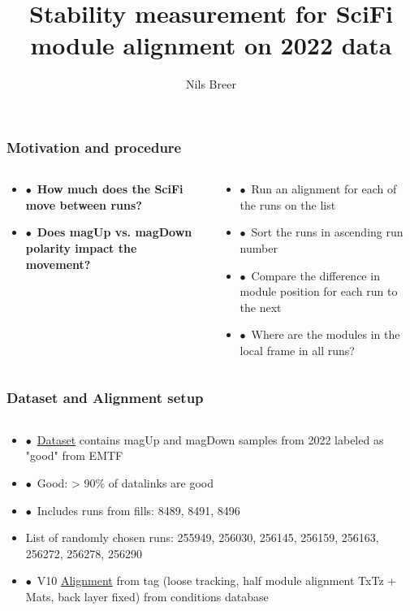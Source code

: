 \documentclass[aspectratio=1610, 12pt]{beamer}
\title{Stability measurement for SciFi module alignment on 2022 data}
\author[N.Breer]{Nils Breer}
\institute{TU Dortmund, AG Albrecht}
\begin{document}
\maketitle

\begin{frame}\frametitle{Motivation and procedure}
  \begin{columns}
    \begin{column}[c]{0.4\textwidth}
      \begin{itemize}
        \setlength\itemsep{1em}
        \item $\bullet$\, \textbf{How much does the SciFi move between runs?}
        \item $\bullet$\, \textbf{Does magUp vs. magDown polarity impact the movement?}
      \end{itemize}
    \end{column}
    \begin{column}[c]{0.6\textwidth}
      \begin{itemize}
        \item $\bullet$\, Run an alignment for each of the runs on the list
        \item $\bullet$\, Sort the runs in ascending run number
        \item $\bullet$\, Compare the difference in module position for each run to the next
        \item $\bullet$\, Where are the modules in the local frame in all runs?
      \end{itemize}
    \end{column}
  \end{columns}
\end{frame}

\begin{frame}\frametitle{Dataset and Alignment setup}
  \begin{columns}
    \begin{column}[c]{0.9\textwidth}
      \begin{itemize}
        \setlength\itemsep{0em}
        \item $\bullet$\, \href{https://twiki.cern.ch/twiki/bin/viewauth/LHCbInternal/CommissioningData2022}{Dataset} contains magUp and magDown samples from 2022 labeled as "good" from EMTF
        \item $\bullet$\, Good: > 90\% of datalinks are good
        \item $\bullet$\, Includes runs from fills: 8489, 8491, 8496
        \item List of randomly chosen runs: 255949, 256030, 256145, 256159, 256163, 256272, 256278, 256290
        \item $\bullet$\, V10 \href{https://indico.cern.ch/event/1283973/contributions/5394548/attachments/2642212/4572628/Alignv3_summary.pdf}{Alignment} from tag (loose tracking, half module alignment TxTz + Mats, back layer fixed) from conditions database
      \end{itemize}
    \end{column}
  \end{columns}
\end{frame}
\end{document}

